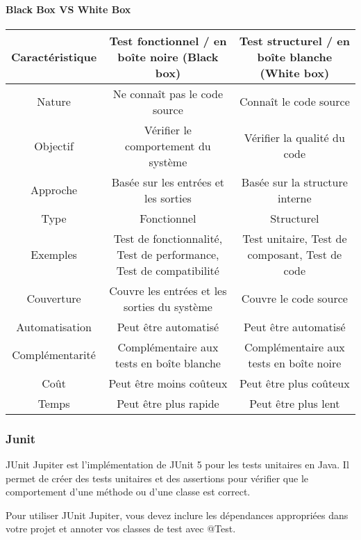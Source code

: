 \paragraph{Black Box VS White Box}

\begin{table}[H]
	\begin{adjustbox}{max width=\textwidth}
		\begin{tabular}{c|c|c}
			\toprule
			\textbf{Caractéristique} & \textbf{Test fonctionnel / en boîte noire (Black box)} & \textbf{Test structurel / en boîte blanche (White box)} \\
			\midrule
			Nature & Ne connaît pas le code source & Connaît le code source \\
			Objectif & Vérifier le comportement du système & Vérifier la qualité du code \\
			Approche & Basée sur les entrées et les sorties & Basée sur la structure interne \\
			Type & Fonctionnel & Structurel \\
			Exemples & Test de fonctionnalité, Test de performance, Test de compatibilité & Test unitaire, Test de composant, Test de code\\
			Couverture & Couvre les entrées et les sorties du système & Couvre le code source  \\
			Automatisation & Peut être automatisé & Peut être automatisé \\
			Complémentarité & Complémentaire aux tests en boîte blanche & Complémentaire aux tests en boîte noire \\
			Coût & Peut être moins coûteux & Peut être plus coûteux \\
			Temps & Peut être plus rapide & Peut être plus lent \\
			\bottomrule
			
		\end{tabular}
		
	\end{adjustbox}
\end{table}

\subsubsection{Junit}
JUnit Jupiter est l'implémentation de JUnit 5 pour les tests unitaires en Java. Il permet de créer des tests unitaires et des assertions pour vérifier que le comportement d'une méthode ou d'une classe est correct.

Pour utiliser JUnit Jupiter, vous devez inclure les dépendances appropriées dans votre projet et annoter vos classes de test avec @Test.



